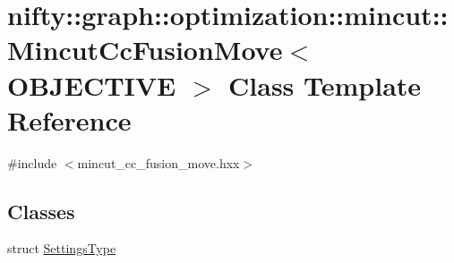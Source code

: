 \hypertarget{classnifty_1_1graph_1_1optimization_1_1mincut_1_1MincutCcFusionMove}{}\section{nifty\+:\+:graph\+:\+:optimization\+:\+:mincut\+:\+:Mincut\+Cc\+Fusion\+Move$<$ O\+B\+J\+E\+C\+T\+I\+V\+E $>$ Class Template Reference}
\label{classnifty_1_1graph_1_1optimization_1_1mincut_1_1MincutCcFusionMove}


{\ttfamily \#include $<$mincut\+\_\+cc\+\_\+fusion\+\_\+move.\+hxx$>$}

\subsection*{Classes}
\begin{DoxyCompactItemize}
\item 
struct \hyperlink{structnifty_1_1graph_1_1optimization_1_1mincut_1_1MincutCcFusionMove_1_1SettingsType}{Settings\+Type}
\end{DoxyCompactItemize}
